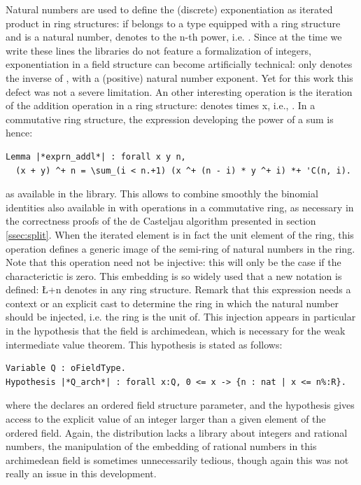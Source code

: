 \documentclass{mscs}
\begin{document}
Natural numbers are used to define the (discrete) exponentiation as
iterated
product in ring structures: if  belongs to a type equipped with a
ring structure and  is a natural number,  denotes 
 to the {n}-th power, i.e. .
Since at the time we write these lines
the \ssr{} libraries do not feature a formalization of integers,
exponentiation in a field structure can become artificially
technical:  only denotes the inverse of , with a
(positive) natural number exponent. Yet for
this work this defect was not a severe limitation.
An other interesting operation is the iteration of the addition
operation in a ring structure:  denotes  times \C{}x,
i.e., .  In a commutative ring structure,
the expression developing the power of a sum is hence:
\begin{lstlisting}
Lemma |*exprn_addl*| : forall x y n,
  (x + y) ^+ n = \sum_(i < n.+1) (x ^+ (n - i) * y ^+ i) *+ 'C(n, i).
\end{lstlisting}
as available in the \ssr{} library. This allows to combine
smoothly the binomial identities also available in \ssr{} with
operations in a commutative ring, as necessary in the correctness
proofs of the de Casteljau algorithm presented in section 
\ref{ssec:split}.
When the iterated element  is
in fact  the unit element of the ring, this operation defines a
generic image of the semi-ring of natural numbers in the
ring. Note that this operation need not be injective: this will only
be the case if the characterictic is zero.
This embedding is so widely used that a new notation is defined: \L+n%
denotes  in any ring structure. Remark that this expression
needs a context or an explicit cast to determine the ring in which the
natural number should be injected, i.e. the ring  is the unit of.
This injection appears in particular in the
hypothesis that the field is archimedean, which is necessary for the weak intermediate value theorem.
This hypothesis is stated as follows:
\begin{lstlisting}
Variable Q : oFieldType.
Hypothesis |*Q_arch*| : forall x:Q, 0 <= x -> {n : nat | x <= n%:R}.
\end{lstlisting}
where the  declares an ordered field structure
parameter, and the  hypothesis gives access to the
explicit value of an integer larger than a given element of the
ordered field. Again, the \ssr{} distribution lacks a library about
integers and rational numbers, the manipulation of the
embedding of rational numbers in this archimedean field is sometimes
unnecessarily tedious, though again this was not really an issue in
this development.
\end{document}
